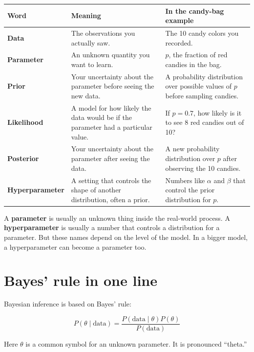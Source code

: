 \documentclass[11pt]{article}
\newcommand{\data}{\text{data}}
\begin{document}
\begin{center}
\begin{tabularx}{\textwidth}{>{\bfseries}p{} X X}
\toprule
Word & Meaning & In the candy-bag example \\
\midrule
Data & The observations you actually saw. & The 10 candy colors you recorded. \\
Parameter & An unknown quantity you want to learn. & $p$, the fraction of red candies in the bag. \\
Prior & Your uncertainty about the parameter before seeing the new data. & A probability distribution over possible values of $p$ before sampling candies. \\
Likelihood & A model for how likely the data would be if the parameter had a particular value. & If $p=0.7$, how likely is it to see 8 red candies out of 10? \\
Posterior & Your uncertainty about the parameter after seeing the data. & A new probability distribution over $p$ after observing the 10 candies. \\
Hyperparameter & A setting that controls the shape of another distribution, often a prior. & Numbers like $\alpha$ and $\beta$ that control the prior distribution for $p$. \\
\bottomrule
\end{tabularx}
\end{center}

\begin{warningbox}
A \textbf{parameter} is usually an unknown thing inside the real-world process. A \textbf{hyperparameter} is usually a number that controls a distribution for a parameter. But these names depend on the level of the model. In a bigger model, a hyperparameter can become a parameter too.
\end{warningbox}

\section{Bayes' rule in one line}

Bayesian inference is based on Bayes' rule:

\begin{equation}
\boxed{\displaystyle
P(\theta \mid \data) = \frac{P(\data \mid \theta)P(\theta)}{P(\data)}
}
\end{equation}

Here $\theta$ is a common symbol for an unknown parameter. It is pronounced ``theta.''
\end{document}
